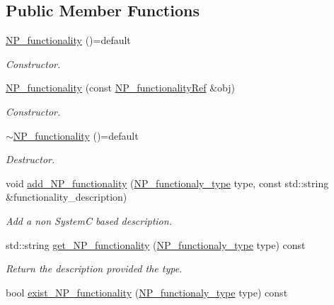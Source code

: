 \subsection*{Public Member Functions}
\begin{DoxyCompactItemize}
\item 
\hyperlink{classNP__functionality_ada94aac25ef8d7282adf5ba4c7a23ddf}{N\+P\+\_\+functionality} ()=default
\begin{DoxyCompactList}\small\item\em Constructor. \end{DoxyCompactList}\item 
\hyperlink{classNP__functionality_a289c00958ea59e11a4d6d02758fa1a86}{N\+P\+\_\+functionality} (const \hyperlink{NP__functionality_8hpp_aacd74315d343c1054cd3c01e18627049}{N\+P\+\_\+functionality\+Ref} \&obj)
\begin{DoxyCompactList}\small\item\em Constructor. \end{DoxyCompactList}\item 
\hyperlink{classNP__functionality_a85fbdf19898fd49b58d9bd288a3b3d1f}{$\sim$\+N\+P\+\_\+functionality} ()=default
\begin{DoxyCompactList}\small\item\em Destructor. \end{DoxyCompactList}\item 
void \hyperlink{classNP__functionality_a9196a24d011ae0a9e6e5bc4fed912ef7}{add\+\_\+\+N\+P\+\_\+functionality} (\hyperlink{classNP__functionality_a318d6f254060bfdf145ebeb41efe772e}{N\+P\+\_\+functionaly\+\_\+type} type, const std\+::string \&functionality\+\_\+description)
\begin{DoxyCompactList}\small\item\em Add a non SystemC based description. \end{DoxyCompactList}\item 
std\+::string \hyperlink{classNP__functionality_aabcd7ea1bf14f96b7eeacf7251a68365}{get\+\_\+\+N\+P\+\_\+functionality} (\hyperlink{classNP__functionality_a318d6f254060bfdf145ebeb41efe772e}{N\+P\+\_\+functionaly\+\_\+type} type) const
\begin{DoxyCompactList}\small\item\em Return the description provided the type. \end{DoxyCompactList}\item 
bool \hyperlink{classNP__functionality_a3aff579cc53f4ecc42e7cd5b1c790142}{exist\+\_\+\+N\+P\+\_\+functionality} (\hyperlink{classNP__functionality_a318d6f254060bfdf145ebeb41efe772e}{N\+P\+\_\+functionaly\+\_\+type} type) const

\end{DoxyCompactItemize}
